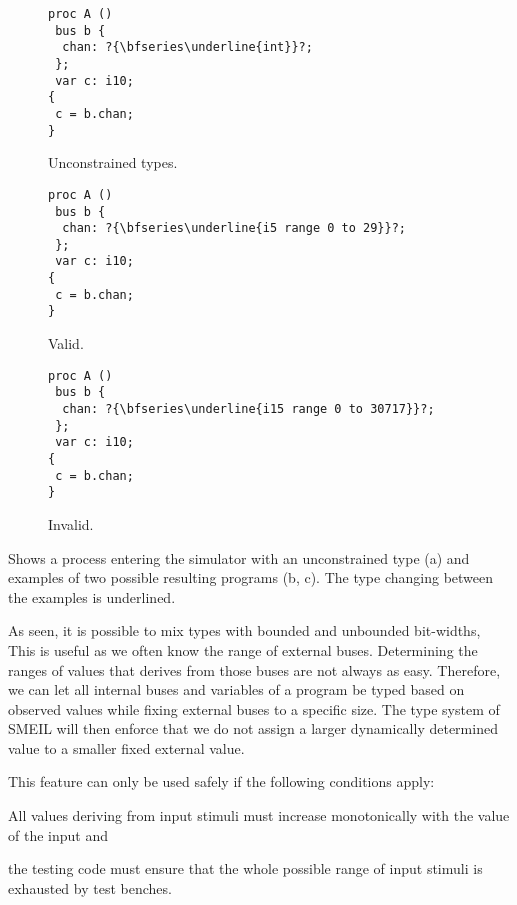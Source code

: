 \begin{widefigure}
  \centering
  \begin{subfigure}[t]{0.30\linewidth}
\begin{lstlisting}[language=smeil]
proc A ()
 bus b {
  chan: ?{\bfseries\underline{int}}?;
 };
 var c: i10;
{
 c = b.chan;
}
\end{lstlisting}
    \caption{Unconstrained types.}
    \label{fig:oktype}
  \end{subfigure}
  \begin{subfigure}[t]{0.30\linewidth}
    \begin{lstlisting}[language=smeil]
proc A ()
 bus b {
  chan: ?{\bfseries\underline{i5 range 0 to 29}}?;
 };
 var c: i10;
{
 c = b.chan;
}
    \end{lstlisting}
    \caption{Valid.}
    \label{fig:non-violated}
  \end{subfigure}
  \begin{subfigure}[t]{0.30\linewidth}
    \begin{lstlisting}[language=smeil]
proc A ()
 bus b {
  chan: ?{\bfseries\underline{i15 range 0 to 30717}}?;
 };
 var c: i10;
{
 c = b.chan;
}
\end{lstlisting}
    \caption{Invalid.}
    \label{fig:violated}
  \end{subfigure}
  \caption{Shows a process entering the simulator with an unconstrained type (a)
    and examples of two possible resulting programs (b, c). The type changing
    between the examples is underlined.}
  \label{fig:simtyping}
\end{widefigure}

As seen, it is possible to mix types with bounded and unbounded bit-widths, This
is useful as we often know the range of external buses. Determining the
ranges of values that derives from those buses are not always as
easy. Therefore, we can let all internal buses and variables of a program be
typed based on observed values while fixing external buses to a specific
size. The type system of SMEIL will then enforce that we do not assign a larger
dynamically determined value to a smaller fixed external value.

This feature can only be used safely if the following conditions
apply: \begin{inparaenum}[1)] \item All values deriving from input stimuli must
  increase monotonically with the value of the input and \item the testing code
  must ensure that the whole possible range of input stimuli is exhausted by
  test benches.
\end{inparaenum}

